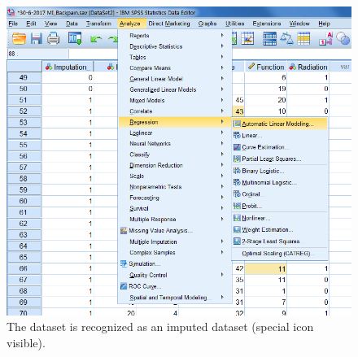 \documentclass[]{book}
\theoremstyle{definition}
\theoremstyle{definition}
\theoremstyle{definition}
\theoremstyle{remark}
\begin{document}
\begin{figure}

{\centering \includegraphics[width=0.9\linewidth]{images/fig5.4b} 

}

\caption{The dataset is recognized as an imputed dataset (special icon visible).}\label{fig:fig5-4b}
\end{figure}
\end{document}
